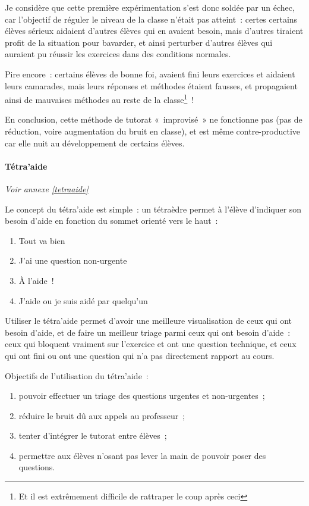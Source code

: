 Je considère que cette première expérimentation s'est donc soldée par un échec, car
l'objectif de réguler le niveau de la classe n'était pas atteint : certes certains
élèves sérieux aidaient d'autres élèves qui en avaient besoin, mais d'autres tiraient
profit de la situation pour bavarder, et ainsi perturber d'autres élèves qui
auraient pu réussir les exercices dans des conditions normales.

Pire encore : certains élèves de bonne foi, avaient fini leurs exercices et aidaient
leurs camarades, mais leurs réponses et méthodes étaient fausses, et propagaient
ainsi de mauvaises méthodes au reste de la classe\footnote{Et il est extrêmement difficile de
rattraper le coup après ceci} !

En conclusion, cette méthode de tutorat « improvisé » ne fonctionne pas (pas de réduction, voire augmentation
du bruit en classe), et est même contre-productive car elle nuit au développement
de certains élèves.

\paragraph{Tétra'aide}

\textit{Voir annexe \ref{tetraaide}}

Le concept du tétra'aide est simple : un tétraèdre permet à l'élève d'indiquer
son besoin d'aide en fonction du sommet orienté vers le haut :
\begin{enumerate}
    \item Tout va bien
    \item J'ai une question non-urgente
    \item À l'aide !
    \item J'aide ou je suis aidé par quelqu'un
\end{enumerate}

Utiliser le tétra'aide permet d'avoir une meilleure visualisation de ceux qui ont
besoin d'aide, et de faire un meilleur triage parmi ceux qui ont besoin d'aide :
ceux qui bloquent vraiment sur l'exercice et ont une question technique, et ceux
qui ont fini ou ont une question qui n'a pas directement rapport au cours.

Objectifs de l'utilisation du tétra'aide :
\begin{enumerate}
    \item pouvoir effectuer un triage des questions urgentes et non-urgentes ;
    \item réduire le bruit dû aux appels au professeur ;
    \item tenter d'intégrer le tutorat entre élèves ;
    \item permettre aux élèves n'osant pas lever la main de pouvoir poser des questions.
\end{enumerate}

